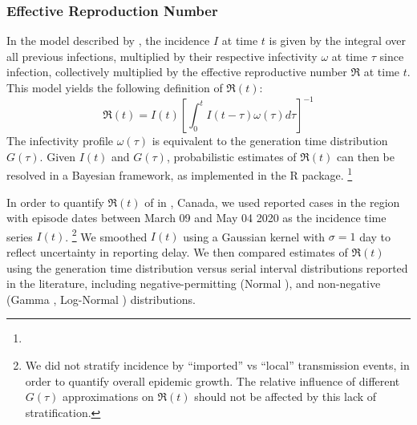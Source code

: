 \subsubsection{Effective Reproduction Number}
In the model described by \textcite{Cori2013},
the incidence $I$ at time $t$ is given by
the integral over all previous infections,
multiplied by their respective infectivity $\omega$
at time $\tau$ since infection,
collectively multiplied by the effective reproductive number
$\Re$ at time $t$.
This model yields the following definition of $\Re(t)$:
\begin{equation}
\Re(t) = I(t) {\left[\int_{0}^{t}{I(t-\tau) \omega(\tau) d\tau}\right]}^{-1}
\end{equation}
The infectivity profile $\omega(\tau)$ is equivalent to
the generation time distribution $G(\tau)$.
Given $I(t)$ and $G(\tau)$,
probabilistic estimates of $\Re(t)$
can then be resolved in a Bayesian framework,
as implemented in the  R package.%
\footnote{}
\par
In order to quantify $\Re(t)$ of \covid in \gta, Canada,
we used reported cases in the region
with episode dates between March 09 and May 04 2020
as the incidence time series $I(t)$.%
\footnote{We did not stratify incidence by
  ``imported'' vs ``local'' transmission events,
  in order to quantify overall epidemic growth.
  The relative influence of different $G(\tau)$ approximations on $\Re(t)$
  should not be affected by this lack of stratification.
}
We smoothed $I(t)$ using a Gaussian kernel with $\sigma = 1$ day
to reflect uncertainty in reporting delay.  %
We then compared estimates of $\Re(t)$ using
the \mle generation time distribution
versus serial interval distributions reported in the literature,
including negative-permitting (Normal \cite{Du2020}),
and non-negative (Gamma \cite{Zhang2020}, Log-Normal \cite{Nishiura2020})
distributions.